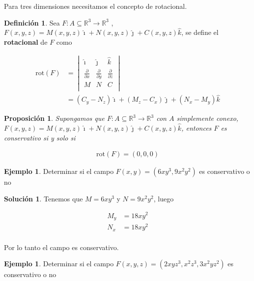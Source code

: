 \documentclass{article}
\theoremstyle{plain}
\newtheorem{prop}[thm]{Proposición}
\theoremstyle{definition}
\newtheorem{defin}[thm]{Definición}
\newtheorem{ejem}[thm]{Ejemplo}
\newtheorem{sol}[thm]{Solución}
\begin{document}
Para tres dimensiones necesitamos el concepto de rotacional. \\


\begin{defin}Sea $F: A \subseteq \mathbb{R}^3 \to \mathbb{R}^3$ , $F(x,y,z)=M(x,y,z)\hat{\imath}+N(x,y,z)\hat{\jmath}+C(x,y,z)\hat{k}$, se define el \textbf{rotacional} de $F$ como
\end{defin}

\begin{align*}
    \text{rot} ( F ) &= \begin{vmatrix}
        \hat{\imath} & \hat{\jmath} & \hat{k} \\
        \frac{\partial}{\partial x} & \frac{\partial}{\partial y} & \frac{\partial}{\partial z} \\
        M & N & C \\
    \end{vmatrix} \\
    &= (C_y-N_z)\hat{\imath}+ (M_z-C_x)\hat{\jmath}+ (N_x-M_y)\hat{k}
\end{align*}

\begin{prop}Supongamos que $F: A \subseteq \mathbb{R}^3 \to \mathbb{R}^3$ con $A$ simplemente conexo, $F(x,y,z)=M(x,y,z)\hat{\imath}+N(x,y,z)\hat{\jmath}+C(x,y,z)\hat{k}$, entonces $F$ es conservativo  si y solo si
\end{prop}

\begin{align*}
    \text{rot} ( F ) = (0,0,0)
\end{align*}


\begin{ejem}Determinar si el campo $F(x,y) = (6xy^3,9x^2y^2)$ es conservativo o no \\
\end{ejem}

\begin{sol}Tenemos que $M= 6xy^3$ y $ N = 9x^2y^2$, luego
\end{sol}

\begin{align*}
    M_y &= 18xy^2 \\
    N_x &= 18xy^2 \\
\end{align*}

Por lo tanto el campo es conservativo. \\

\begin{ejem}Determinar si el campo $F(x,y,z) = (2xyz^3,x^2z^3, 3x^2yz^2)$ es conservativo o no \\
\end{ejem}
\end{document}
